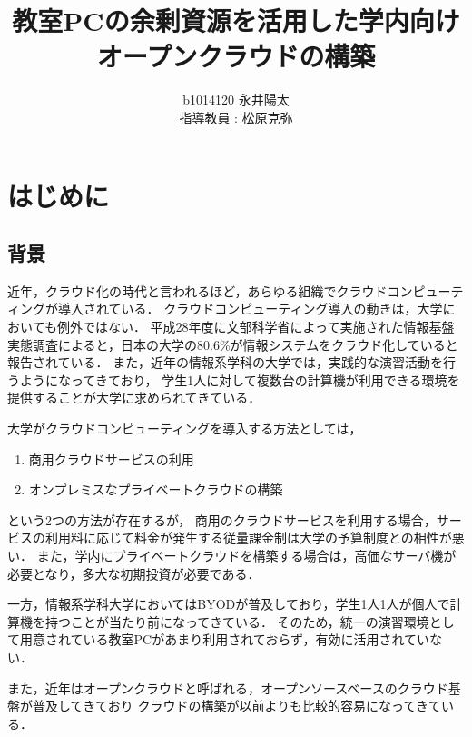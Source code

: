 \documentclass[10pt,a4paper]{jsarticle}
\author{%
b1014120 永井陽太\\指導教員 : 松原克弥
}
\title{教室PCの余剰資源を活用した学内向けオープンクラウドの構築}
\begin{document}
\maketitle

\section{はじめに}
\subsection{背景}
近年，クラウド化の時代と言われるほど，あらゆる組織でクラウドコンピューティングが導入されている\cite{academiccloud}．
クラウドコンピューティング導入の動きは，大学においても例外ではない．
平成28年度に文部科学省によって実施された情報基盤実態調査によると，日本の大学の80.6\%が情報システムをクラウド化していると報告されている\cite{SurveyOnActualStateOfAcademicInformationInfrastructure}．
また，近年の情報系学科の大学では，実践的な演習活動を行うようになってきており\cite{practicalict}，
学生1人に対して複数台の計算機が利用できる環境を提供することが大学に求められてきている．
\par 大学がクラウドコンピューティングを導入する方法としては，
\begin{enumerate}
	\item 商用クラウドサービスの利用
	\item オンプレミスなプライベートクラウドの構築
\end{enumerate}
という2つの方法が存在するが，
商用のクラウドサービスを利用する場合，サービスの利用料に応じて料金が発生する従量課金制は大学の予算制度との相性が悪い．
また，学内にプライベートクラウドを構築する場合は，高価なサーバ機が必要となり，多大な初期投資が必要である．
\par 一方，情報系学科大学においてはBYODが普及しており，学生1人1人が個人で計算機を持つことが当たり前になってきている．
そのため，統一の演習環境として用意されている教室PCがあまり利用されておらず，有効に活用されていない．
\par また，近年はオープンクラウドと呼ばれる，オープンソースベースのクラウド基盤が普及してきており
クラウドの構築が以前よりも比較的容易になってきている．
\end{document}

